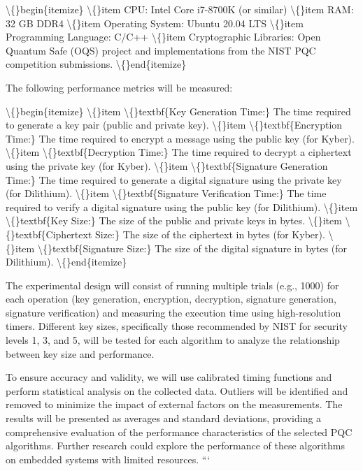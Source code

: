 \documentclass{article}
\begin{document}
\textbackslash\{\}begin\{itemize\}
    \textbackslash\{\}item CPU: Intel Core i7-8700K (or similar)
    \textbackslash\{\}item RAM: 32 GB DDR4
    \textbackslash\{\}item Operating System: Ubuntu 20.04 LTS
    \textbackslash\{\}item Programming Language: C/C++
    \textbackslash\{\}item Cryptographic Libraries: Open Quantum Safe (OQS) project and implementations from the NIST PQC competition submissions.
\textbackslash\{\}end\{itemize\}

The following performance metrics will be measured:

\textbackslash\{\}begin\{itemize\}
    \textbackslash\{\}item \textbackslash\{\}textbf\{Key Generation Time:\} The time required to generate a key pair (public and private key).
    \textbackslash\{\}item \textbackslash\{\}textbf\{Encryption Time:\} The time required to encrypt a message using the public key (for Kyber).
    \textbackslash\{\}item \textbackslash\{\}textbf\{Decryption Time:\} The time required to decrypt a ciphertext using the private key (for Kyber).
    \textbackslash\{\}item \textbackslash\{\}textbf\{Signature Generation Time:\} The time required to generate a digital signature using the private key (for Dilithium).
    \textbackslash\{\}item \textbackslash\{\}textbf\{Signature Verification Time:\} The time required to verify a digital signature using the public key (for Dilithium).
    \textbackslash\{\}item \textbackslash\{\}textbf\{Key Size:\} The size of the public and private keys in bytes.
    \textbackslash\{\}item \textbackslash\{\}textbf\{Ciphertext Size:\} The size of the ciphertext in bytes (for Kyber).
    \textbackslash\{\}item \textbackslash\{\}textbf\{Signature Size:\} The size of the digital signature in bytes (for Dilithium).
\textbackslash\{\}end\{itemize\}

The experimental design will consist of running multiple trials (e.g., 1000) for each operation (key generation, encryption, decryption, signature generation, signature verification) and measuring the execution time using high-resolution timers. Different key sizes, specifically those recommended by NIST for security levels 1, 3, and 5, will be tested for each algorithm to analyze the relationship between key size and performance.

To ensure accuracy and validity, we will use calibrated timing functions and perform statistical analysis on the collected data. Outliers will be identified and removed to minimize the impact of external factors on the measurements. The results will be presented as averages and standard deviations, providing a comprehensive evaluation of the performance characteristics of the selected PQC algorithms. Further research could explore the performance of these algorithms on embedded systems with limited resources.
```
\end{document}
